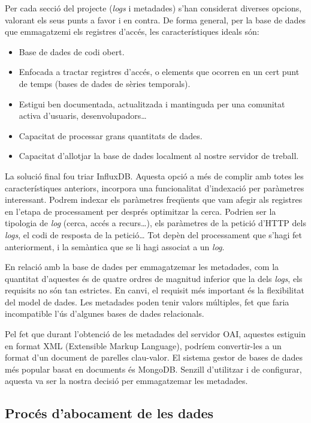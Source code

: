 \documentclass[lettersize,journal]{IEEEtran}
\begin{document}
Per cada secció del projecte (\textit{logs} i metadades) s'han considerat diverses opcions, valorant els seus punts a favor i en contra.
De forma general, per la base de dades que emmagatzemi els registres d'accés, les característiques ideals són:
\begin{itemize}
    \item Base de dades de codi obert.
    \item Enfocada a tractar registres d'accés, o elements que ocorren en un cert punt de temps (bases de dades de sèries temporals).
    \item Estigui ben documentada, actualitzada i mantinguda per una comunitat activa d'usuaris, desenvolupadors\dots
    \item Capacitat de processar grans quantitats de dades.
    \item Capacitat d'allotjar la base de dades localment al nostre servidor de treball.
\end{itemize}

La solució final fou triar InfluxDB.
Aquesta opció a més de complir amb totes les característiques anteriors, incorpora una funcionalitat d'indexació per paràmetres interessant.
Podrem indexar els paràmetres freqüents que vam afegir als registres en l'etapa de processament per després optimitzar la cerca.
Podrien ser la tipologia de \textit{log} (cerca, accés a recurs\dots), els paràmetres de la petició d'HTTP dels \textit{logs}, el codi de resposta de la petició\dots
Tot depèn del processament que s'hagi fet anteriorment, i la semàntica que se li hagi associat a un \textit{log}.

En relació amb la base de dades per emmagatzemar les metadades, com la quantitat d'aquestes és de quatre ordres de magnitud inferior que la dels \textit{logs}, els requisits no són tan estrictes.
En canvi, el requisit més important és la flexibilitat del model de dades.
Les metadades poden tenir valors múltiples, fet que faria incompatible l'ús d'algunes bases de dades relacionals.

Pel fet que durant l'obtenció de les metadades del servidor OAI, aquestes estiguin en format XML (Extensible Markup Language), podríem convertir-les a un format d'un document de parelles clau-valor.
El sistema gestor de bases de dades més popular basat en documents és MongoDB.
Senzill d'utilitzar i de configurar, aquesta va ser la nostra decisió per emmagatzemar les metadades.

\subsection{Procés d'abocament de les dades}\label{subsec:data-storing-process}
\end{document}
